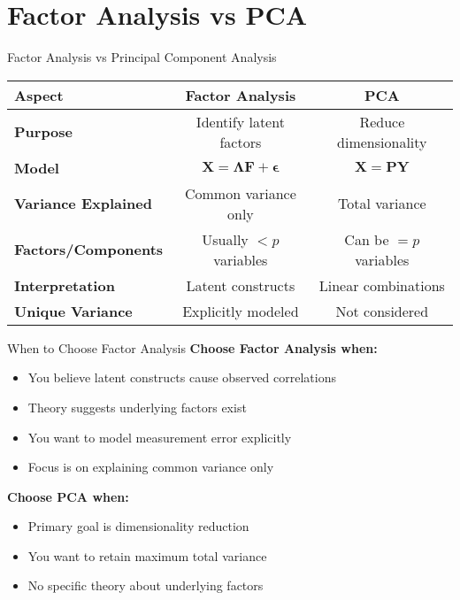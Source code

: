 \documentclass[aspectratio=169]{beamer}
\begin{document}
\section{Factor Analysis vs PCA}
\begin{frame}{Factor Analysis vs Principal Component Analysis}
  \begin{center}
  \begin{tabular}{|l|c|c|}
    \hline
    \textbf{Aspect} & \textbf{Factor Analysis} & \textbf{PCA} \\
    \hline
    \textbf{Purpose} & Identify latent factors & Reduce dimensionality \\
    \hline
    \textbf{Model} & $\mathbf{X} = \mathbf{\Lambda F} + \mathbf{\epsilon}$ & $\mathbf{X} = \mathbf{PY}$ \\
    \hline
    \textbf{Variance Explained} & Common variance only & Total variance \\
    \hline
    \textbf{Factors/Components} & Usually $< p$ variables & Can be $= p$ variables \\
    \hline
    \textbf{Interpretation} & Latent constructs & Linear combinations \\
    \hline
    \textbf{Unique Variance} & Explicitly modeled & Not considered \\
    \hline
  \end{tabular}
  \end{center}
\end{frame}

\begin{frame}{When to Choose Factor Analysis}
  \textbf{Choose Factor Analysis when:}
  \begin{itemize}
    \item You believe latent constructs cause observed correlations
    \item Theory suggests underlying factors exist
    \item You want to model measurement error explicitly
    \item Focus is on explaining common variance only
  \end{itemize}
  
  \textbf{Choose PCA when:}
  \begin{itemize}
    \item Primary goal is dimensionality reduction
    \item You want to retain maximum total variance
    \item No specific theory about underlying factors
  \end{itemize}
\end{frame}
\end{document}
